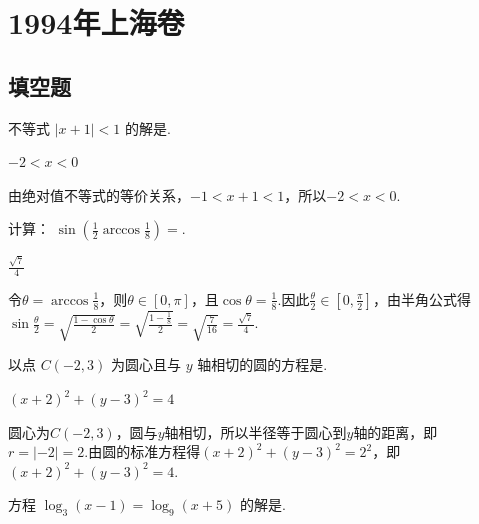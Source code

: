 \chapter{1994年上海卷}
\section{填空题}

\begin{problem}
不等式 \(|x + 1| < 1\) 的解是\fillinblank{}.
\end{problem}

\begin{answer}
\(-2 < x < 0\)
\end{answer}

\begin{solution}
由绝对值不等式的等价关系，\(-1 < x + 1 < 1\)，所以\(-2 < x < 0\).
\end{solution}

\begin{problem}
计算： \(\sin \left(\frac{1}{2} \arccos \frac{1}{8}\right) =\)\fillinblank{}.
\end{problem}

\begin{answer}
\(\frac{\sqrt{7}}{4}\)
\end{answer}

\begin{solution}
令\(\theta=\arccos\frac{1}{8}\)，则\(\theta\in[0,\pi]\)，且\(\cos\theta=\frac{1}{8}\).因此\(\frac{\theta}{2}\in[0,\frac{\pi}{2}]\)，由半角公式得
\(\sin\frac{\theta}{2}=\sqrt{\frac{1-\cos\theta}{2}}=\sqrt{\frac{1-\frac{1}{8}}{2}}=\sqrt{\frac{7}{16}}=\frac{\sqrt{7}}{4}\).
\end{solution}

\begin{problem}
以点 \(C(-2,3)\) 为圆心且与 \(y\) 轴相切的圆的方程是\fillinblank{}.
\end{problem}

\begin{answer}
\((x + 2)^2 + (y - 3)^2 = 4\)
\end{answer}

\begin{solution}
圆心为\(C(-2,3)\)，圆与\(y\)轴相切，所以半径等于圆心到\(y\)轴的距离，即\(r=|-2|=2\).由圆的标准方程得\((x+2)^2+(y-3)^2=2^2\)，即\((x+2)^2+(y-3)^2=4\).
\end{solution}

\begin{problem}
方程 \(\log_3(x - 1) = \log_9(x + 5)\) 的解是\fillinblank{}.
\end{problem}


